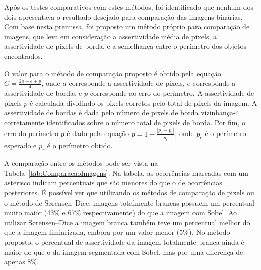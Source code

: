 \documentclass[12pt,oneside,a4paper,english,french,spanish,brazil,]{abntex2}
\begin{document}
Após os testes comparativos com estes métodos, foi identificado que nenhum dos dois apresentava o resultado desejado para comparação das imagens binárias. Com base nesta premissa, foi proposto um método próprio para comparação de imagens, que leva em consideração a assertividade média de pixels, a assertividade de pixels de borda, e a semelhança entre o perímetro dos objetos encontrados.

O valor para o método de comparação proposto é obtido pela equação \(C=\frac{2a+e+p}{4}\), onde \(a\) corresponde a assertividade de pixels, \(e\) corresponde a assertividade de bordas e \(p\) corresponde ao erro do perímetro. A assertividade de pixels \(p\) é calculada dividindo os pixels corretos pelo total de pixels da imagem.  A assertividade de bordas é dada pelo número de pixels de borda vizinhança-4 corretamente identificados sobre o número total de pixels de borda. Por fim, o erro do perímetro \(p\) é dado pela equação \(p=1-\frac{|p_{e} - p_{r}|}{p_{r}}\), onde \(p_{e}\) é o perímetro esperado e \(p_{r}\) é o perímetro obtido.

A comparação entre os métodos pode ser vista na Tabela~\ref{tab:ComparacaoImagens}. Na tabela, as ocorrências marcadas com um asterisco indicam percentuais que são menores do que o de ocorrências posteriores. É possível ver que utilizando os métodos de comparação de pixels ou o método de Sørensen–Dice, imagens totalmente brancas possuem um percentual muito maior (43\% e 67\% respectivamente) do que a imagem com Sobel. Ao utilizar Sørensen–Dice a imagem branca também teve um percentual melhor do que a imagem limiarizada, embora por um valor menor (5\%). No método proposto, o percentual de assertividade da imagem totalmente branca ainda é maior do que o da imagem segmentada com Sobel, mas por uma diferença de apenas 8\%.
\end{document}
